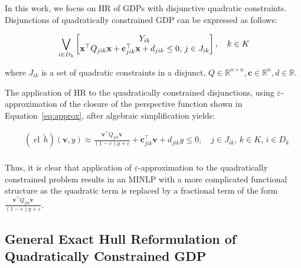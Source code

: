 \documentclass[11pt]{article}
\begin{document}
In this work, we focus on HR of GDPs with disjunctive quadratic constraints.
Disjunctions of quadratically constrained GDP can be expressed as follows:

\begingroup
\begin{equation}
\setlength{\jot}{0pt}
\begin{aligned}
    &\bigvee_{i \in D_k} 
        \begin{bmatrix} 
            Y_{ik} \\
            \mathbf{x}^\top Q_{jik} \mathbf{x} + \mathbf{c}_{jik}^\top \mathbf{x} + d_{jik} \leq 0 ,\, j \in J_{ik}
        \end{bmatrix}, \quad k \in K \\
\end{aligned}
\label{eq:Q-GDP}
\end{equation}
\endgroup

\noindent where \(J_{ik}\) is a set of quadratic constraints in a disjunct, \(Q \in \mathbb{R}^{n \times n}, \mathbf{c} \in \mathbb{R}^n, d \in \mathbb{R}\).

The application of HR to the quadratically constrained disjunctions, using \(\varepsilon\)-approximation of the closure of the perspective function shown in Equation~\eqref{eq:approx}, after algebraic simplification yields:


\begingroup
\begin{equation}
\begin{aligned}
    & \left(\operatorname{cl}\,\widetilde{h}\right)(\mathbf{v},y) \approx \frac{\mathbf{v}^\top Q_{jik}  \mathbf{v}}{(1-\varepsilon)y + \varepsilon} + \mathbf{c}_{jik}^\top \mathbf{v} + d_{jik} y \leq 0, \quad j \in J_{ik},\, k \in K,\, i \in D_k \\
\end{aligned}
\label{eq:Q-HR}
\end{equation}
\endgroup

Thus, it is clear that application of \(\varepsilon\)-approximation to the quadratically constrained problem results in an MINLP with a more complicated functional structure as the quadratic term is replaced by a fractional term of the form \( \frac{\mathbf{v}^\top Q_{jik}  \mathbf{v}}{(1-\varepsilon)y + \varepsilon}  \). 


\subsection{General Exact Hull Reformulation of Quadratically Constrained GDP}
\label{sec:quadratic-hull}
\end{document}
